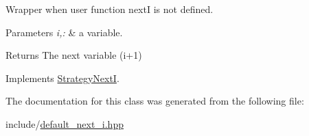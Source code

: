 \-Wrapper when user function next\-I is not defined. 


\begin{DoxyParams}{\-Parameters}
{\em i,\-:} & a variable. \\
\hline
\end{DoxyParams}
\begin{DoxyReturn}{\-Returns}
\-The next variable (i+1) 
\end{DoxyReturn}


\-Implements \hyperlink{classStrategyNextI_a3ae2498d9c8c316b9248e08c9d5ec3a3}{\-Strategy\-Next\-I}.



\-The documentation for this class was generated from the following file\-:\begin{DoxyCompactItemize}
\item 
include/\hyperlink{default__next__i_8hpp}{default\-\_\-next\-\_\-i.\-hpp}\end{DoxyCompactItemize}
